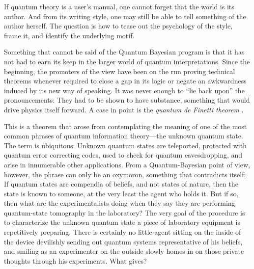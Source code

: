 If quantum theory is a user's manual, one cannot forget that the world is its author.  And from its writing style, one may still be able to tell something of the author herself.  The question is how to tease out the psychology of the style, frame it, and identify the underlying motif.

Something that cannot be said of the Quantum Bayesian program is that it has not had to earn its keep in the larger world of quantum interpretations.  Since the beginning, the promoters of the view have been on the run proving technical theorems whenever required to close a gap in its logic or negate an awkwardness induced by its new way of speaking.  It was never enough to ``lie back upon'' the pronouncements:  They had to be shown to have substance, something that would drive physics itself forward.  A case in point is the {\it quantum de Finetti theorem} \cite{Fuchs04,Caves02b}.

This is a theorem that arose from contemplating the meaning of one of the most common phrases of quantum information theory---the unknown quantum state.  The term is ubiquitous:  Unknown quantum states are teleported, protected with quantum error correcting codes, used to check for quantum eavesdropping, and arise in innumerable other applications.  From a Quantum-Bayesian point of view, however, the phrase can only be an oxymoron, something that contradicts itself:  If quantum states are compendia of beliefs, and not states of nature, then the state is known to someone, at the very least the agent who holds it.  But if so, then what are the experimentalists doing when they say they are performing quantum-state tomography in the laboratory?  The very goal of the procedure is to characterize the unknown quantum state a piece of laboratory equipment is repetitively preparing. There is certainly no little agent sitting on the inside of the device devilishly sending out quantum systems representative of his beliefs, and smiling as an experimenter on the outside slowly homes in on those private thoughts through his experiments.  What gives?


